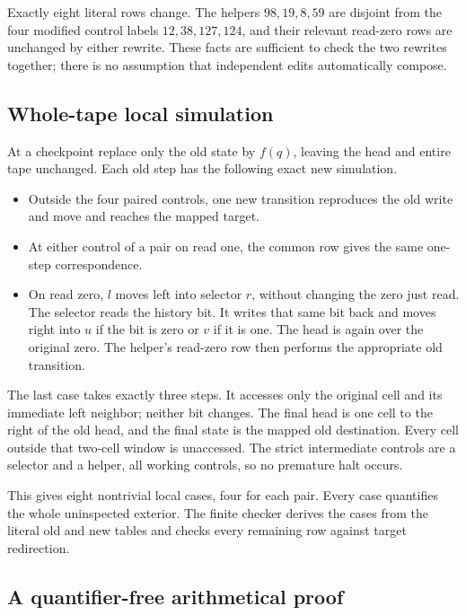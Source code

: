 Exactly eight literal rows change.  The helpers
$98,19,8,59$ are disjoint from the four modified control labels
$12,38,127,124$, and their relevant read-zero rows are unchanged by either
rewrite.  These facts are sufficient to check the two rewrites together;
there is no assumption that independent edits automatically compose.

\subsection{Whole-tape local simulation}

At a checkpoint replace only the old state by $f(q)$, leaving the head
and entire tape unchanged.  Each old step has the following exact new
simulation.
\begin{itemize}
\item Outside the four paired controls, one new transition reproduces
      the old write and move and reaches the mapped target.
\item At either control of a pair on read one, the common row gives the
      same one-step correspondence.
\item On read zero, $l$ moves left into selector $r$, without changing
      the zero just read.  The selector reads the history bit.  It writes
      that same bit back and moves right into $u$ if the bit is zero or
      $v$ if it is one.  The head is again over the original zero.
      The helper's read-zero row then performs the appropriate old
      transition.
\end{itemize}
The last case takes exactly three steps.  It accesses only the original
cell and its immediate left neighbor; neither bit changes.  The final
head is one cell to the right of the old head, and the final state is
the mapped old destination.  Every cell outside that two-cell window is
unaccessed.  The strict intermediate controls are a selector and a
helper, all working controls, so no premature halt occurs.

This gives eight nontrivial local cases, four for each pair.  Every case
quantifies the whole uninspected exterior.  The finite checker derives
the cases from the literal old and new tables and checks every remaining
row against target redirection.

\subsection{A quantifier-free arithmetical proof}

